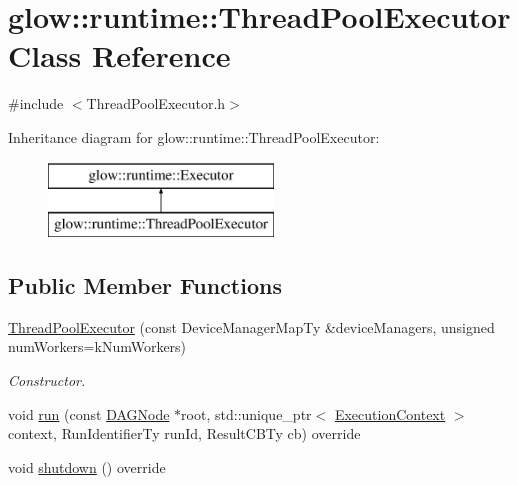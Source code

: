 \hypertarget{classglow_1_1runtime_1_1_thread_pool_executor}{}\section{glow\+:\+:runtime\+:\+:Thread\+Pool\+Executor Class Reference}
\label{classglow_1_1runtime_1_1_thread_pool_executor}


{\ttfamily \#include $<$Thread\+Pool\+Executor.\+h$>$}

Inheritance diagram for glow\+:\+:runtime\+:\+:Thread\+Pool\+Executor\+:\begin{figure}[H]
\begin{center}
\leavevmode
\includegraphics[height=2.000000cm]{classglow_1_1runtime_1_1_thread_pool_executor}
\end{center}
\end{figure}
\subsection*{Public Member Functions}
\begin{DoxyCompactItemize}
\item 
\mbox{\label{classglow_1_1runtime_1_1_thread_pool_executor_a32aa26680344c7bbd1d4855679d4663b}} 
\hyperlink{classglow_1_1runtime_1_1_thread_pool_executor_a32aa26680344c7bbd1d4855679d4663b}{Thread\+Pool\+Executor} (const Device\+Manager\+Map\+Ty \&device\+Managers, unsigned num\+Workers=k\+Num\+Workers)
\begin{DoxyCompactList}\small\item\em Constructor. \end{DoxyCompactList}\item 
void \hyperlink{classglow_1_1runtime_1_1_thread_pool_executor_a2f0225f88e53cf550e98db5b5037449e}{run} (const \hyperlink{structglow_1_1runtime_1_1_d_a_g_node}{D\+A\+G\+Node} $\ast$root, std\+::unique\+\_\+ptr$<$ \hyperlink{classglow_1_1_execution_context}{Execution\+Context} $>$ context, Run\+Identifier\+Ty run\+Id, Result\+C\+B\+Ty cb) override
\item 
void \hyperlink{classglow_1_1runtime_1_1_thread_pool_executor_ad77508bfa19d1ebaad7547b1bbce68f8}{shutdown} () override
\end{DoxyCompactItemize}


